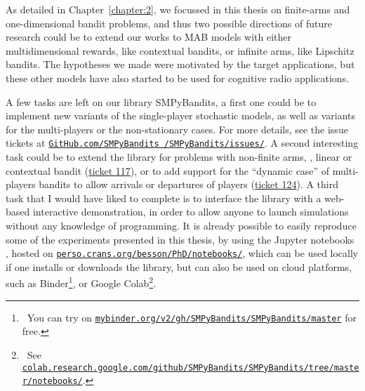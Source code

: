
As detailed in Chapter~\ref{chapter:2}, we focussed in this thesis on finite-arms and one-dimensional bandit problems,
and thus two possible directions of future research could be to extend our works
to MAB models with either multidimensional rewards, like contextual bandits, or infinite arms, like Lipschitz bandits.
The hypotheses we made were motivated by the target applications, but these other models have also started to be used for cognitive radio applications.



A few tasks are left on our library SMPyBandits, a first one could be to implement new variants of the single-player stochastic models, as well as variants for the multi-players or the non-stationary cases.
For more details, see the issue tickets at \href{https://github.com/SMPyBandits/SMPyBandits/issues/}{\texttt{GitHub.com/SMPyBandits /SMPyBandits/issues/}}.
%
A second interesting task could be to extend the library for problems with non-finite arms, \eg, linear or contextual bandit (\href{https://github.com/SMPyBandits/SMPyBandits/issues/117}{ticket 117}),
or to add support for the ``dynamic case'' of multi-players bandits to allow arrivals or departures of players (\href{https://github.com/SMPyBandits/SMPyBandits/issues/124}{ticket 124}).
%
A third task that I would have liked to complete is to interface the library with a web-based interactive demonstration, in order to allow anyone to launch simulations without any knowledge of programming.
It is already possible to easily reproduce some of the experiments presented in this thesis, by using the Jupyter notebooks \cite{jupyter}, hosted on \href{https://perso.crans.org/besson/PhD/notebooks/}{\texttt{perso.crans.org/besson/PhD/notebooks/}}, which can be used locally if one installs or downloads the library, but can also be used on cloud platforms, such as
Binder\footnote{~You can try on \href{https://mybinder.org/v2/gh/SMPyBandits/SMPyBandits/master}{\texttt{mybinder.org/v2/gh/SMPyBandits/SMPyBandits/master}} for free.},
or Google Colab\footnote{~See \href{https://colab.research.google.com/github/SMPyBandits/SMPyBandits/tree/master/notebooks/}{\texttt{colab.research.google.com/github/SMPyBandits/SMPyBandits/tree/master/notebooks/}}.}.



